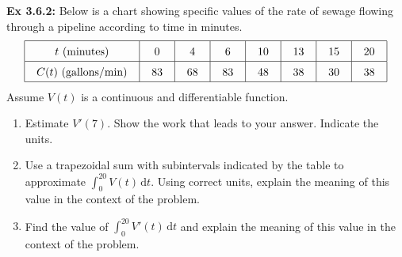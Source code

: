 \begin{tcolorbox}[example]
    \textbf{Ex 3.6.2: } Below is a chart showing specific values of the rate of sewage flowing through a pipeline according to time in minutes. \begin{align*}
        \arraycolsep=11pt\def\arraystretch{1.5}
        \begin{array}{|c|c|c|c|c|c|c|c|}
            \hline
            t \text{ (minutes)} & 0 & 4 & 6 & 10 & 13 & 15 & 20 \\ \hline
            C(t) \text{ (gallons/min)} & 83 & 68 & 83 & 48 & 38 & 30 & 38 \\
            \hline
        \end{array}
    \end{align*}
    Assume $V(t)$ is a continuous and differentiable function. \par
    \begin{enumerate}[label=\hspace{11pt}(\alph*), align=left, leftmargin=*, labelsep=0.25em]
        \item Estimate $V'(7)$. Show the work that leads to your answer. Indicate the units. \\
        \item Use a trapezoidal sum with subintervals indicated by the table to approximate $\int_0^{20} V(t) \,\mathrm{d}t$. Using correct units, explain the meaning of this value in the context of the problem. \\
        \item Find the value of $\int_0^{20} V'(t) \,\mathrm{d}t$ and explain the meaning of this value in the context of the problem.
    \end{enumerate}
\end{tcolorbox}
